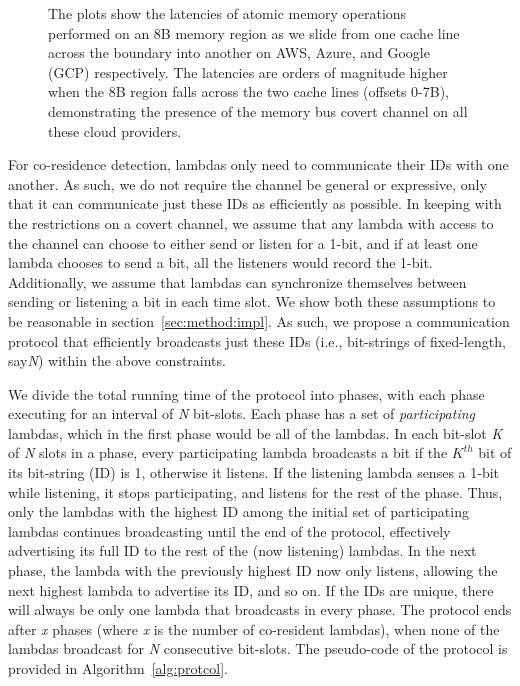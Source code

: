 \begin{figure}[h!]
\begin{subfigure}{.33\textwidth}
  \end{subfigure}
  \caption{The plots show the latencies of atomic memory operations performed on
          an 8B memory region as we slide from one cache line across the boundary into
          another on AWS, Azure, and Google (GCP) respectively.  The latencies are orders
          of magnitude higher when the 8B region falls across the two cache lines (offsets
          0-7B), demonstrating the presence of the memory bus covert channel on all these
          cloud providers. \label{fig:membus_clouds}}
  \label{fig:fig}
  \end{figure}

For co-residence detection, lambdas only need to communicate their IDs with one
another. As such, we do not require the channel be general or
expressive, only that it can communicate just these IDs as efficiently as 
possible. In keeping with the restrictions on a covert channel,
we assume that any lambda with access to the channel can choose to either send or
listen for a 1-bit, and if at least one lambda chooses to send a bit, all the
listeners would record the 1-bit. Additionally, we assume that lambdas can synchronize
themselves between sending or listening a bit in each time slot. We show both
these assumptions to be reasonable in section~\ref{sec:method:impl}. As such, we
propose a communication protocol that efficiently broadcasts just these
IDs (i.e., bit-strings of fixed-length, say\emph{N}) within the above constraints.

We divide the total running time of the protocol into phases, with each phase
executing for an interval of \textit{N} bit-slots. Each phase has a set of
\textit{participating} lambdas, which in the first phase would be all of the
lambdas. In each bit-slot \textit{K} of \textit{N} slots in a phase, every
participating lambda broadcasts a bit if the $K^{th}$ bit of its bit-string (ID)
is 1, otherwise it listens. If the listening lambda senses a 1-bit while
listening, it stops participating, and listens for the rest of the phase. Thus,
only the lambdas with the highest ID among the initial set of participating
lambdas continues broadcasting until the end of the protocol, effectively
advertising its full ID to the rest of the (now listening) lambdas. In the next
phase, the lambda with the previously highest ID now only listens, allowing the
next highest lambda to advertise its ID, and so on.  If the IDs are unique,
there will always be only one lambda that broadcasts in every phase. The
protocol ends after \textit{x} phases (where \textit{x} is the number of co-resident
lambdas), when none of the lambdas broadcast for \textit{N} consecutive
bit-slots. The pseudo-code of the protocol is provided in Algorithm~\ref{alg:protcol}. 

